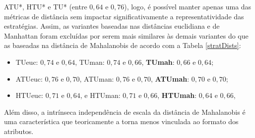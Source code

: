 ATU*, HTU* e TU* (entre $0,64$ e $0,76$), logo,
é possível manter apenas uma das métricas de distância sem impactar
significativamente a representatividade das estratégias.
Assim, as variantes baseadas nas distâncias euclidiana e de Manhattan
foram excluídas por serem mais similares às demais variantes do que as baseadas na
distância de Mahalanobis de acordo com a Tabela \ref{stratDists}:
\begin{itemize}
\item TUeuc: $0,74$ e $0,64$, TUman: $0,74$ e $0,66$, \textbf{TUmah}: $0,66$ e $0,64$;
\item ATUeuc: $0,76$ e $0,70$, ATUman: $0,76$ e $0,70$, \textbf{ATUmah}: $0,70$ e $0,70$;
\item HTUeuc: $0,71$ e $0,64$, e HTUman: $0,71$ e $0,66$, \textbf{HTUmah}: $0,64$ e $0,66$,
 \end{itemize}
Além disso, a intrínseca independência de escala da distância de Mahalanobis é uma
característica que teoricamente a torna menos vinculada ao formato dos atributos.


